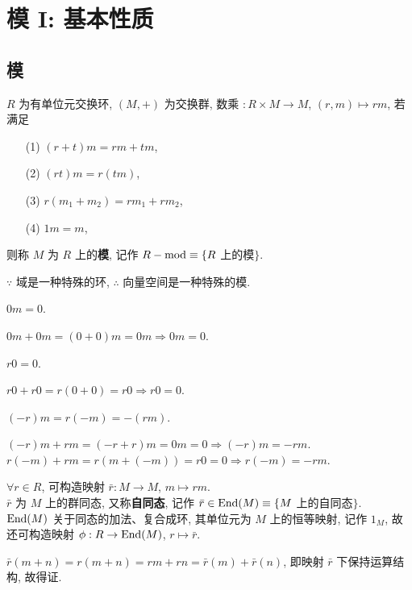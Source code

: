 \documentclass{note}
\begin{document}
\fi
\chapter{模 I: 基本性质}
\section{模}
\begin{df}[模]
    $R$ 为有单位元交换环, $(M,+)$ 为交换群, 数乘 $:R\times M\rightarrow M$, $(r,m)\mapsto rm$, 若满足
    \begin{itemize}
        \item[(1)] $(r+t)m=rm+tm$,
        \item[(2)] $(rt)m=r(tm)$,
        \item[(3)] $r(m_1+m_2)=rm_1+rm_2$,
        \item[(4)] $1m=m$,
    \end{itemize}
    则称 $M$ 为 $R$ 上的\textbf{模}, 记作 $R-\operatorname{mod}\equiv\{R$ 上的模$\}$.
\end{df}

$\because$ 域是一种特殊的环, $\therefore$ 向量空间是一种特殊的模.

$0m=0$.
\begin{pf}
    $0m+0m=(0+0)m=0m\Longrightarrow 0m=0$.
\end{pf}

$r0=0$.
\begin{pf}
    $r0+r0=r(0+0)=r0\Longrightarrow r0=0$.
\end{pf}

$(-r)m=r(-m)=-(rm)$.
\begin{pf}
    $(-r)m+rm=(-r+r)m=0m=0\Longrightarrow(-r)m=-rm$.\\
    $r(-m)+rm=r(m+(-m))=r0=0\Longrightarrow r(-m)=-rm$.
\end{pf}

$\forall r\in R$, 可构造映射 $\bar{r}:M\rightarrow M$, $m\mapsto rm$.\\
$\bar{r}$ 为 $M$ 上的群同态, 又称\textbf{自同态}, 记作 $\bar{r}\in\operatorname{End}(M)\equiv\{M$ 上的自同态$\}$.\\
$\operatorname{End}(M)$ 关于同态的加法、复合成环, 其单位元为 $M$ 上的恒等映射, 记作 $1_M$, 故还可构造映射 $\phi:R\rightarrow\operatorname{End}(M)$, $r\mapsto\bar{r}$.
\begin{pf}
    $\bar{r}(m+n)=r(m+n)=rm+rn=\bar{r}(m)+\bar{r}(n)$, 即映射 $\bar{r}$ 下保持运算结构, 故得证.
\end{pf}
\end{document}
